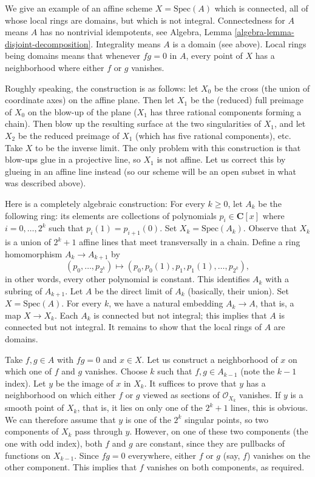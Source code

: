 \begin{example}
\label{example-connected-locally-integral-not-integral}
We give an example of an affine scheme $X = \text{Spec}(A)$ which is
connected, all of whose local rings are domains, but which is not integral.
Connectedness for $A$ means $A$ has no nontrivial idempotents, see
Algebra, Lemma \ref{algebra-lemma-disjoint-decomposition}.
Integrality means $A$ is a domain (see above). Local rings being domains
means that whenever $fg = 0$ in $A$, every point of $X$ has a neighborhood
where either $f$ or $g$ vanishes.

\medskip\noindent
Roughly speaking, the construction is as follows: let $X_0$ be the cross
(the union of coordinate axes) on the affine plane. Then let $X_1$ be
the (reduced) full preimage of $X_0$ on the blow-up of the plane ($X_1$
has three rational components forming a chain).  Then blow up the
resulting surface at the two singularities of $X_1$, and let $X_2$ be
the reduced preimage of $X_1$ (which has five rational components), etc.
Take $X$ to be the inverse limit. The only problem with this construction
is that blow-ups glue in a projective line, so $X_1$ is not affine. Let us
correct this by glueing in an affine line instead (so our scheme will be an
open subset in what was described above). 

\medskip\noindent
Here is a completely algebraic construction: For every $k \ge 0$, let $A_k$
be the following ring: its elements are collections of
polynomials $p_i \in \mathbf{C}[x]$ where $i = 0, \dots, 2^k$ such that
$p_i(1) = p_{i + 1}(0)$. Set $X_k = \text{Spec}(A_k)$. Observe that $X_k$ is
a union of $2^k + 1$ affine lines that meet transversally in a chain.
Define a ring homomorphism $A_k \to A_{k + 1}$ by
$$
(p_0, \dots, p_{2^k})
\longmapsto
(p_0, p_0(1), p_1, p_1(1), \dots, p_{2^k}),
$$
in other words, every other polynomial is constant. This identifies
$A_k$ with a subring of $A_{k + 1}$. Let $A$ be the direct limit of $A_k$
(basically, their union). Set $X = \text{Spec}(A)$. For every $k$, we have
a natural embedding $A_k \to A$, that is, a map $X\to X_k$.
Each $A_k$ is connected but not integral; this implies that $A$ is
connected but not integral. It remains to show that the local rings of
$A$ are domains.

\medskip\noindent
Take $f, g \in A$ with $fg = 0$ and $x \in X$. Let us construct a
neighborhood of $x$ on which one of $f$ and $g$ vanishes. Choose $k$
such that $f,g \in A_{k - 1}$ (note the $k - 1$ index).
Let $y$ be the image of $x$ in $X_k$. It suffices to prove that $y$ has
a neighborhood on which either $f$ or $g$ viewed as sections of
$\mathcal{O}_{X_k}$ vanishes.
If $y$ is a smooth point of $X_k$, that is, it lies on only one of the
$2^k + 1$ lines, this is obvious. We can therefore assume that $y$ is one
of the $2^k$ singular points, so two components of $X_k$ pass through
$y$. However, on one of these two components (the one with odd index),
both $f$ and $g$ are constant, since they are pullbacks of functions on
$X_{k - 1}$. Since $fg = 0$ everywhere, either $f$ or $g$ (say, $f$)
vanishes on the other component.
This implies that $f$ vanishes on both components, as required. 
\end{example}
